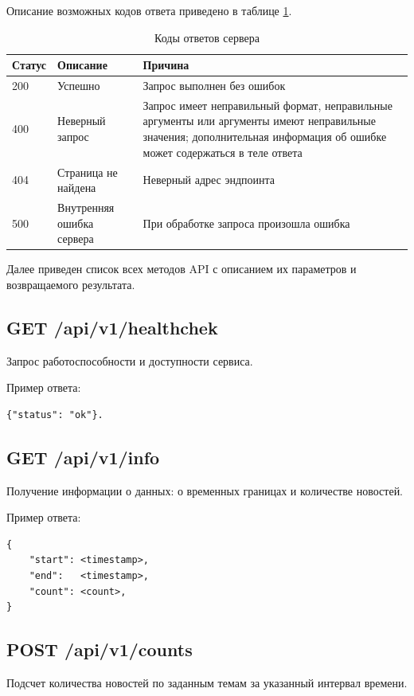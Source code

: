 Описание возможных кодов ответа приведено в таблице \ref{tab:status-codes}.

\begin{table}[ht]
    \caption{Коды ответов сервера}
    \label{tab:status-codes}
    \begin{tabularx}{\textwidth}{|l|l|X|}
        \hline
        Статус & Описание & Причина \\
        \hline
        200 & Успешно & Запрос выполнен без ошибок \\
        \hline
        400 & Неверный запрос & Запрос имеет неправильный формат, неправильные аргументы или аргументы имеют неправильные значения; дополнительная информация об ошибке может содержаться в теле ответа \\
        \hline
        404 & Страница не найдена & Неверный адрес эндпоинта \\
        \hline
        500 & Внутренняя ошибка сервера & При обработке запроса произошла ошибка \\
        \hline
    \end{tabularx}
\end{table}

Далее приведен список всех методов API с описанием их параметров и возвращаемого результата.


\subsection{GET /api/v1/healthchek}
Запрос работоспособности и доступности сервиса.

Пример ответа:
\begin{lstlisting}
{"status": "ok"}.
\end{lstlisting}

\subsection{GET /api/v1/info}
Получение информации о данных: о временных границах и количестве новостей.

Пример ответа:
\begin{lstlisting}
{
    "start": <timestamp>,
    "end":   <timestamp>,
    "count": <count>,
}
\end{lstlisting}

\subsection{POST /api/v1/counts}
Подсчет количества новостей по заданным темам за указанный интервал времени.

